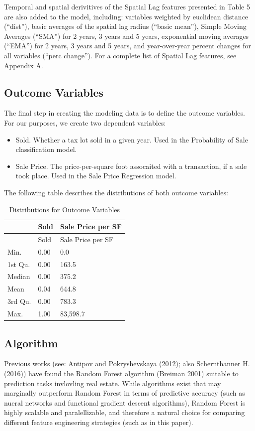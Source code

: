 \documentclass[]{article}
\providecommand{\tightlist}{%
  \setlength{\itemsep}{0pt}\setlength{\parskip}{0pt}}
\begin{document}
Temporal and spatial derivitives of the Spatial Lag features presented
in Table 5 are also added to the model, including: variables weighted by
euclidean distance (``dist''), basic averages of the spatial lag radius
(``basic mean''), Simple Moving Averages (``SMA'') for 2 years, 3 years
and 5 years, exponential moving averages (``EMA'') for 2 years, 3 years
and 5 years, and year-over-year percent changes for all variables
(``perc change''). For a complete list of Spatial Lag features, see
Appendix A.

\subsection{Outcome Variables}\label{outcome-variables}

The final step in creating the modeling data is to define the outcome
variables. For our purposes, we create two dependent variables:

\begin{itemize}
\tightlist
\item
  Sold. Whether a tax lot sold in a given year. Used in the Probability
  of Sale classification model.
\item
  Sale Price. The price-per-square foot assocaited with a transaction,
  if a sale took place. Used in the Sale Price Regression model.
\end{itemize}

The following table describes the distributions of both outcome
variables:

\begin{longtable}[]{@{}lll@{}}
\caption{Distributions for Outcome Variables}\tabularnewline
\toprule
& Sold & Sale Price per SF\tabularnewline
\midrule
\endfirsthead
\toprule
& Sold & Sale Price per SF\tabularnewline
\midrule
\endhead
Min. & 0.00 & 0.0\tabularnewline
1st Qu. & 0.00 & 163.5\tabularnewline
Median & 0.00 & 375.2\tabularnewline
Mean & 0.04 & 644.8\tabularnewline
3rd Qu. & 0.00 & 783.3\tabularnewline
Max. & 1.00 & 83,598.7\tabularnewline
\bottomrule
\end{longtable}

\subsection{Algorithm}\label{algorithm}

Previous works (see: Antipov and Pokryshevskaya (2012); also
Schernthanner H. (2016)) have found the Random Forest algorithm (Breiman
2001) suitable to prediction tasks invlovling real estate. While
algorithms exist that may marginally outperform Random Forest in terms
of predictive accuracy (such as nueral networks and functional gradient
descent algorithms), Random Forest is highly scalable and
paralellizable, and therefore a natural choice for comparing different
feature engineering strategies (such as in this paper).
\end{document}
